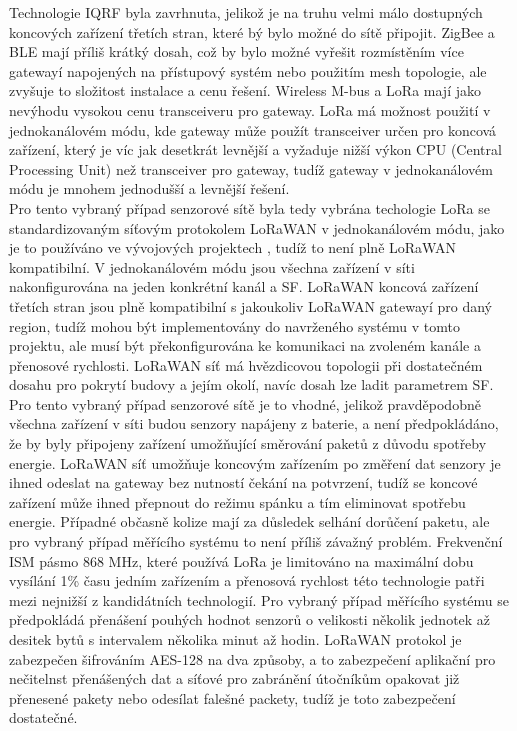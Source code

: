 
Technologie IQRF byla zavrhnuta, jelikož je na truhu velmi málo dostupných koncových zařízení třetích stran, které bý bylo možné do sítě připojit. 
ZigBee a BLE mají příliš krátký dosah, což by bylo možné vyřešit rozmístěním více gatewayí napojených na přístupový systém nebo použitím mesh topologie, ale zvyšuje to složitost instalace a cenu řešení. 
Wireless M-bus a LoRa mají jako nevýhodu vysokou cenu transceiveru pro gateway. 
LoRa má možnost použití v jednokanálovém módu, kde gateway může použít transceiver určen pro koncová zařízení, který je víc jak desetkrát levnější a vyžaduje nižší výkon CPU (Central Processing Unit) než transceiver pro gateway, tudíž gateway v jednokanálovém módu je mnohem jednodušší a levnější řešení.
\\

Pro tento vybraný případ senzorové sítě byla tedy vybrána techologie LoRa se standardizovaným síťovým protokolem LoRaWAN v jednokanálovém módu, jako je to používáno ve vývojových projektech \cite{Analysis of Propagation Link for Remote Weather}, tudíž to není plně LoRaWAN kompatibilní.
V jednokanálovém módu jsou všechna zařízení v síti nakonfigurována na jeden konkrétní kanál a SF.
LoRaWAN koncová zařízení třetích stran jsou plně kompatibilní s jakoukoliv LoRaWAN gatewayí pro daný region, tudíž mohou být implementovány do navrženého systému v tomto projektu, ale musí být překonfigurována ke komunikaci na zvoleném kanále a přenosové rychlosti. 
LoRaWAN síť má hvězdicovou topologii při dostatečném dosahu pro pokrytí budovy a jejím okolí, navíc dosah lze ladit parametrem SF. Pro tento vybraný případ senzorové sítě je to vhodné, jelikož pravděpodobně všechna zařízení v síti budou senzory napájeny z baterie, a není předpokládáno, že by byly připojeny zařízení umožňující směrování paketů z důvodu spotřeby energie. 
LoRaWAN síť umožňuje koncovým zařízením po změření dat senzory je ihned odeslat na gateway bez nutností čekání na potvrzení, tudíž se koncové zařízení může ihned přepnout do režimu spánku a tím eliminovat spotřebu energie. 
Případné občasně kolize mají za důsledek selhání dorůčení paketu, ale pro vybraný případ měřícího systému to není příliš závažný problém.
Frekvenční ISM pásmo 868 MHz, které používá LoRa je limitováno na maximální dobu vysílání 1\% času jedním zařízením a přenosová rychlost této technologie patři mezi nejnižší z kandidátních technologií. 
Pro vybraný případ měřícího systému se předpokládá přenášení pouhých hodnot senzorů o velikosti několik jednotek až desitek bytů s intervalem několika minut až hodin.
LoRaWAN protokol je zabezpečen šifrováním AES-128 na dva způsoby, a to zabezpečení aplikační pro nečitelnst přenášených dat a síťové pro zabránění útočníkům opakovat již přenesené pakety nebo odesílat falešné packety, tudíž je toto zabezpečení dostatečné. 


